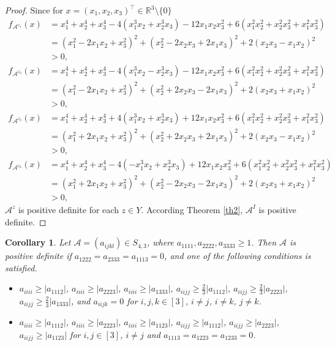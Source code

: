 \documentclass[twoside]{article}
\newtheorem{corollary}{Corollary}[section]
\begin{document}
\begin{proof}
Since for $x=(x_1,x_2,x_3)^{\top}\in\mathbb{R}^3\setminus\{0\}$
\begin{align*}
  f_{\mathcal{A}^{z_1}}(x) &=x_1^4+x_2^4+x_3^4-4(x_1^3x_2+x_2^3x_3)-12x_1x_2x_3^2+6(x_1^2x_2^2+x_2^2x_3^2+x_1^2x_3^2)\\
  &=(x_1^2-2x_1x_2+x_3^2)^2+(x_2^2-2x_2x_3+2x_1x_3)^2+2(x_2x_3-x_1x_2)^2\\
  &>0,
\end{align*}
\begin{align*}
  f_{\mathcal{A}^{z_2}}(x) &=x_1^4+x_2^4+x_3^4-4(x_1^3x_2-x_2^3x_3)-12x_1x_2x_3^2+6(x_1^2x_2^2+x_2^2x_3^2+x_1^2x_3^2)\\
  &=(x_1^2-2x_1x_2+x_3^2)^2+(x_2^2+2x_2x_3-2x_1x_3)^2+2(x_2x_3+x_1x_2)^2\\
  &>0,
\end{align*}
\begin{align*}
  f_{\mathcal{A}^{z_3}}(x) &=x_1^4+x_2^4+x_3^4+4(x_1^3x_2+x_2^3x_3)+12x_1x_2x_3^2+6(x_1^2x_2^2+x_2^2x_3^2+x_1^2x_3^2)\\
  &=(x_1^2+2x_1x_2+x_3^2)^2+(x_2^2+2x_2x_3+2x_1x_3)^2+2(x_2x_3-x_1x_2)^2\\
  &>0,
\end{align*}
\begin{align*}
 f_{\mathcal{A}^{z_4}}(x) &=x_1^4+x_2^4+x_3^4-4(-x_1^3x_2+x_2^3x_3)+12x_1x_2x_3^2+6(x_1^2x_2^2+x_2^2x_3^2+x_1^2x_3^2)\\
  &=(x_1^2+2x_1x_2+x_3^2)^2+(x_2^2-2x_2x_3-2x_1x_3)^2+2(x_2x_3+x_1x_2)^2\\
  &>0,
\end{align*}
$\mathcal{A}^z$ is positive definite for each $z\in Y$. According Theorem \ref{th2}, $\mathcal{A}^I$ is positive definite.

\end{proof}
\begin{corollary}\label{cor5}
Let ${\mathcal{A}}=(a_{ijkl})\in S_{4,3}$, where $a_{1111},a_{2222},a_{3333}\geq1$. Then $\mathcal{A}$ is positive definite if $a_{1222}=a_{2333}=a_{1113}=0$, and one of the following conditions is satisfied.
\begin{itemize}
  \item [(a)] $a_{iiii}\geq|a_{1112}|$, $a_{iiii}\geq |a_{2223}|$, $a_{iiii}\geq|a_{1333}|$, $a_{iijj}\geq \frac{2}{3}|a_{1112}|$, $a_{iijj}\geq \frac{2}{3}|a_{2223}|$, $a_{iijj}\geq \frac{2}{3}|a_{1333}|$, and $a_{iijk}=0$ for $i,j,k\in[3]$, $i\neq j$, $i\neq k$, $j\neq k$.
   \item [(b)]$a_{iiii}\geq|a_{1112}|$, $a_{iiii}\geq |a_{2223}|$, $a_{iiii}\geq|a_{1123}|$, $a_{iijj}\geq |a_{1112}|$, $a_{iijj}\geq |a_{2223}|$, $a_{iijj}\geq |a_{1123}|$ for $i,j\in[3]$, $i\neq j$ and $a_{1113}=a_{1223}=a_{1233}=0$.
 \end{itemize}
\end{corollary}
\end{document}
